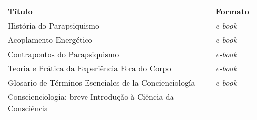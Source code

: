 \documentclass[
]{article}
\begin{document}
\begin{longtable}[]{@{}
  >{\raggedright\arraybackslash}p{}
  >{\raggedright\arraybackslash}p{}@{}}
\toprule\noalign{}
\begin{minipage}[b]{\linewidth}\centering
\textbf{Título}
\end{minipage} & \begin{minipage}[b]{\linewidth}\centering
\textbf{Formato}
\end{minipage} \\
\begin{minipage}[b]{\linewidth}\raggedright
História do Parapsiquismo
\end{minipage} & \begin{minipage}[b]{\linewidth}\raggedright
\emph{e-book}
\end{minipage} \\
\begin{minipage}[b]{\linewidth}\raggedright
Acoplamento Energético
\end{minipage} & \begin{minipage}[b]{\linewidth}\raggedright
\emph{e-book}
\end{minipage} \\
\begin{minipage}[b]{\linewidth}\raggedright
Contrapontos do Parapsiquismo
\end{minipage} & \begin{minipage}[b]{\linewidth}\raggedright
\emph{e-book}
\end{minipage} \\
\begin{minipage}[b]{\linewidth}\raggedright
Teoria e Prática da Experiência Fora do Corpo
\end{minipage} & \begin{minipage}[b]{\linewidth}\raggedright
\emph{e-book}
\end{minipage} \\
\begin{minipage}[b]{\linewidth}\raggedright
Glosario de Términos Esenciales de la Concienciología
\end{minipage} & \begin{minipage}[b]{\linewidth}\raggedright
\emph{e-book}
\end{minipage} \\
\begin{minipage}[b]{\linewidth}\raggedright
Conscienciologia: breve Introdução à Ciência da Consciência

\end{minipage}
\end{longtable}
\end{document}
